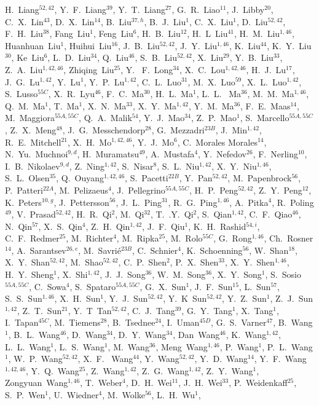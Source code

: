 {\begin{small}
H.~Liang$^{52,42}$, Y.~F.~Liang$^{39}$, Y.~T.~Liang$^{27}$, G.~R.~Liao$^{11}$, J.~Libby$^{20}$, C.~X.~Lin$^{43}$, D.~X.~Lin$^{14}$, B.~Liu$^{37,h}$, B.~J.~Liu$^{1}$, C.~X.~Liu$^{1}$, D.~Liu$^{52,42}$, F.~H.~Liu$^{38}$, Fang~Liu$^{1}$, Feng~Liu$^{6}$, H.~B.~Liu$^{12}$, H.~L~Liu$^{41}$, H.~M.~Liu$^{1,46}$, Huanhuan~Liu$^{1}$, Huihui~Liu$^{16}$, J.~B.~Liu$^{52,42}$, J.~Y.~Liu$^{1,46}$, K.~Liu$^{44}$, K.~Y.~Liu$^{30}$, Ke~Liu$^{6}$, L.~D.~Liu$^{34}$, Q.~Liu$^{46}$, S.~B.~Liu$^{52,42}$, X.~Liu$^{29}$, Y.~B.~Liu$^{33}$, Z.~A.~Liu$^{1,42,46}$, Zhiqing~Liu$^{25}$, Y. ~F.~Long$^{34}$, X.~C.~Lou$^{1,42,46}$, H.~J.~Lu$^{17}$, J.~G.~Lu$^{1,42}$, Y.~Lu$^{1}$, Y.~P.~Lu$^{1,42}$, C.~L.~Luo$^{31}$, M.~X.~Luo$^{59}$, X.~L.~Luo$^{1,42}$, S.~Lusso$^{55C}$, X.~R.~Lyu$^{46}$, F.~C.~Ma$^{30}$, H.~L.~Ma$^{1}$, L.~L. ~Ma$^{36}$, M.~M.~Ma$^{1,46}$, Q.~M.~Ma$^{1}$, T.~Ma$^{1}$, X.~N.~Ma$^{33}$, X.~Y.~Ma$^{1,42}$, Y.~M.~Ma$^{36}$, F.~E.~Maas$^{14}$, M.~Maggiora$^{55A,55C}$, Q.~A.~Malik$^{54}$, Y.~J.~Mao$^{34}$, Z.~P.~Mao$^{1}$, S.~Marcello$^{55A,55C}$, Z.~X.~Meng$^{48}$, J.~G.~Messchendorp$^{28}$, G.~Mezzadri$^{23B}$, J.~Min$^{1,42}$, R.~E.~Mitchell$^{21}$, X.~H.~Mo$^{1,42,46}$, Y.~J.~Mo$^{6}$, C.~Morales Morales$^{14}$, N.~Yu.~Muchnoi$^{9,d}$, H.~Muramatsu$^{49}$, A.~Mustafa$^{4}$, Y.~Nefedov$^{26}$, F.~Nerling$^{10}$, I.~B.~Nikolaev$^{9,d}$, Z.~Ning$^{1,42}$, S.~Nisar$^{8}$, S.~L.~Niu$^{1,42}$, X.~Y.~Niu$^{1,46}$, S.~L.~Olsen$^{35}$, Q.~Ouyang$^{1,42,46}$, S.~Pacetti$^{22B}$, Y.~Pan$^{52,42}$, M.~Papenbrock$^{56}$, P.~Patteri$^{22A}$, M.~Pelizaeus$^{4}$, J.~Pellegrino$^{55A,55C}$, H.~P.~Peng$^{52,42}$, Z.~Y.~Peng$^{12}$, K.~Peters$^{10,g}$, J.~Pettersson$^{56}$, J.~L.~Ping$^{31}$, R.~G.~Ping$^{1,46}$, A.~Pitka$^{4}$, R.~Poling$^{49}$, V.~Prasad$^{52,42}$, H.~R.~Qi$^{2}$, M.~Qi$^{32}$, T.~.Y.~Qi$^{2}$, S.~Qian$^{1,42}$, C.~F.~Qiao$^{46}$, N.~Qin$^{57}$, X.~S.~Qin$^{4}$, Z.~H.~Qin$^{1,42}$, J.~F.~Qiu$^{1}$, K.~H.~Rashid$^{54,i}$, C.~F.~Redmer$^{25}$, M.~Richter$^{4}$, M.~Ripka$^{25}$, M.~Rolo$^{55C}$, G.~Rong$^{1,46}$, Ch.~Rosner$^{14}$, A.~Sarantsev$^{26,e}$, M.~Savri\'e$^{23B}$, C.~Schnier$^{4}$, K.~Schoenning$^{56}$, W.~Shan$^{18}$, X.~Y.~Shan$^{52,42}$, M.~Shao$^{52,42}$, C.~P.~Shen$^{2}$, P.~X.~Shen$^{33}$, X.~Y.~Shen$^{1,46}$, H.~Y.~Sheng$^{1}$, X.~Shi$^{1,42}$, J.~J.~Song$^{36}$, W.~M.~Song$^{36}$, X.~Y.~Song$^{1}$, S.~Sosio$^{55A,55C}$, C.~Sowa$^{4}$, S.~Spataro$^{55A,55C}$, G.~X.~Sun$^{1}$, J.~F.~Sun$^{15}$, L.~Sun$^{57}$, S.~S.~Sun$^{1,46}$, X.~H.~Sun$^{1}$, Y.~J.~Sun$^{52,42}$, Y.~K~Sun$^{52,42}$, Y.~Z.~Sun$^{1}$, Z.~J.~Sun$^{1,42}$, Z.~T.~Sun$^{21}$, Y.~T~Tan$^{52,42}$, C.~J.~Tang$^{39}$, G.~Y.~Tang$^{1}$, X.~Tang$^{1}$, I.~Tapan$^{45C}$, M.~Tiemens$^{28}$, B.~Tsednee$^{24}$, I.~Uman$^{45D}$, G.~S.~Varner$^{47}$, B.~Wang$^{1}$, B.~L.~Wang$^{46}$, D.~Wang$^{34}$, D.~Y.~Wang$^{34}$, Dan~Wang$^{46}$, K.~Wang$^{1,42}$, L.~L.~Wang$^{1}$, L.~S.~Wang$^{1}$, M.~Wang$^{36}$, Meng~Wang$^{1,46}$, P.~Wang$^{1}$, P.~L.~Wang$^{1}$, W.~P.~Wang$^{52,42}$, X.~F. ~Wang$^{44}$, Y.~Wang$^{52,42}$, Y.~D.~Wang$^{14}$, Y.~F.~Wang$^{1,42,46}$, Y.~Q.~Wang$^{25}$, Z.~Wang$^{1,42}$, Z.~G.~Wang$^{1,42}$, Z.~Y.~Wang$^{1}$, Zongyuan~Wang$^{1,46}$, T.~Weber$^{4}$, D.~H.~Wei$^{11}$, J.~H.~Wei$^{33}$, P.~Weidenkaff$^{25}$, S.~P.~Wen$^{1}$, U.~Wiedner$^{4}$, M.~Wolke$^{56}$, L.~H.~Wu$^{1}$, 
\end{small}}
